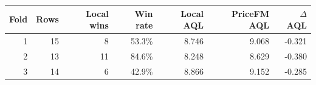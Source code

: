 \begin{tabular}{rrrrrrr}
\toprule
Fold & Rows & Local wins & Win rate & Local AQL & PriceFM AQL & $\Delta$ AQL \\
\midrule
1 & 15 & 8 & 53.3\% & 8.746 & 9.068 & -0.321 \\
2 & 13 & 11 & 84.6\% & 8.248 & 8.629 & -0.380 \\
3 & 14 & 6 & 42.9\% & 8.866 & 9.152 & -0.285 \\
\bottomrule
\end{tabular}
